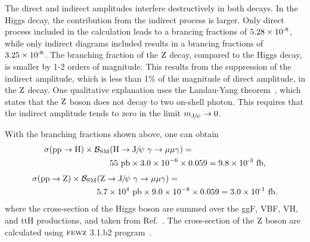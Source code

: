 The direct and indirect amplitudes interfere destructively in both decays. In the Higgs decay, the contribution from the indirect process is larger. Only direct process included in the calculation leads to a brancing fractions of $5.28\times \text{10}^\text{-8}$, while only indirect diagrams included results in a brancing fractions of $3.25\times \text{10}^\text{-6}$. The branching fraction of the $\mathrm{Z}$ decay, compared to the Higgs decay, is smaller by 1-2 orders of magnitude. This results from the suppression of the indirect amplitude, which is less than 1\% of the magnitude of direct amplitude, in the $\mathrm{Z}$ decay. One qualitative explanation uses the Landau-Yang theorem~\cite{PhysRev.77.242}, which states that the $\mathrm{Z}$ boson does not decay to two on-shell photon. This requires that the indirect amplitude tends to zero in the limit $m_{{\mathrm{J}\hspace{-.08em}/\hspace{-.14em}\psi}}\to 0$.

With the branching fractions shown above, one can obtain
\begin{equation}  
\begin{split}
\sigma(\Pp\Pp\to\PH) \times \mathcal{B}_{\text{SM}}&(\PH\to\JPsi\ \gamma\to\mu\mu\gamma) = \\
& 55\ \text{pb} \times 3.0\times10^{-6} \times 0.059 = 9.8\ten{-3}\ \text{fb},
\end{split}
\end{equation}  
\begin{equation} 
\begin{split}
\sigma(\Pp\Pp\to\cPZ) \times \mathcal{B}_{\text{SM}}&(\cPZ\to\JPsi\ \gamma\to\mu\mu\gamma) =\\
& 5.7\times 10^{4}\ \text{pb} \times 9.0\times10^{-8} \times 0.059 = 3.0\ten{-1}\ \text{fb}.
\end{split}
\end{equation}
where the cross-section of the Higgs boson are summed over the ggF, VBF, VH, and ttH productions, and taken from Ref.~\cite{deFlorian:2016spz}. The cross-section of the $\mathrm{Z}$ boson are calculated using ${\textsc{fewz}}$ 3.1.b2 program~\cite{Li:2012wna}.

